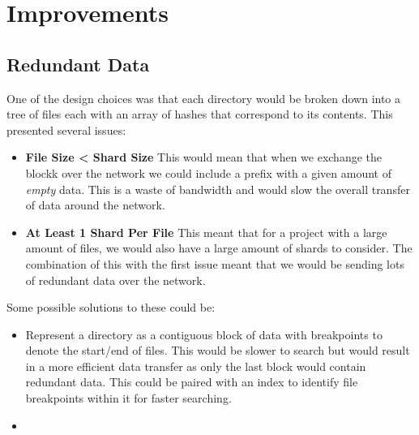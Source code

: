 \section{Improvements}

\subsection{Redundant Data}

One of the design choices was that each directory would be broken down into a tree of files each with an array of hashes that correspond to its contents. This presented several issues:

\begin{itemize}
  \item \textbf{File Size < Shard Size} This would mean that when we exchange the blockk over the network we could include a prefix with a given amount of \textit{empty} data. This is a waste of bandwidth and would slow the overall transfer of data around the network.
  \item \textbf{At Least 1 Shard Per File} This meant that for a project with a large amount of files, we would also have a large amount of shards to consider. The combination of this with the first issue meant that we would be sending lots of redundant data over the network.
\end{itemize}

\vspace{2mm}\noindent
Some possible solutions to these could be:

\begin{itemize}
  \item Represent a directory as a contiguous block of data with breakpoints to denote the start/end of files. This would be slower to search but would result in a more efficient data transfer as only the last block would contain redundant data. This could be paired with an index to identify file breakpoints within it for faster searching.
  \item 
\end{itemize}

